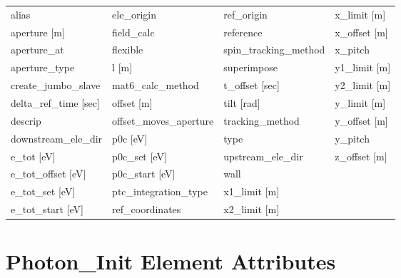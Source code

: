  \begin{tabular}{llll} \toprule
alias                          & ele_origin                     & ref_origin                     & x_limit [m]                    \\
aperture [m]                   & field_calc                     & reference                      & x_offset [m]                   \\
aperture_at                    & flexible                       & spin_tracking_method           & x_pitch                        \\
aperture_type                  & l [m]                          & superimpose                    & y1_limit [m]                   \\
create_jumbo_slave             & mat6_calc_method               & t_offset [sec]                 & y2_limit [m]                   \\
delta_ref_time [sec]           & offset [m]                     & tilt [rad]                     & y_limit [m]                    \\
descrip                        & offset_moves_aperture          & tracking_method                & y_offset [m]                   \\
downstream_ele_dir             & p0c [eV]                       & type                           & y_pitch                        \\
e_tot [eV]                     & p0c_set [eV]                   & upstream_ele_dir               & z_offset [m]                   \\
e_tot_offset [eV]              & p0c_start [eV]                 & wall                           &                                \\
e_tot_set [eV]                 & ptc_integration_type           & x1_limit [m]                   &                                \\
e_tot_start [eV]               & ref_coordinates                & x2_limit [m]                   &                                \\
 \bottomrule
 \end{tabular}
 \vfill
 
 \section{Photon_Init Element Attributes}
 \label{s:list.photon.init}
 
